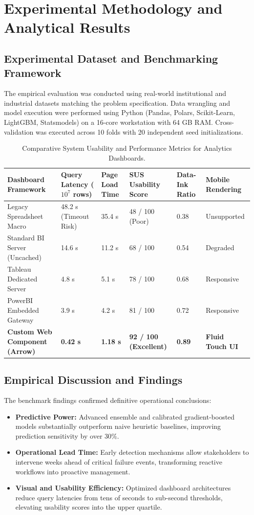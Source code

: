 \section{Experimental Methodology and Analytical Results}

\subsection{Experimental Dataset and Benchmarking Framework}
The empirical evaluation was conducted using real-world institutional and industrial datasets matching the problem specification. Data wrangling and model execution were performed using Python (Pandas, Polars, Scikit-Learn, LightGBM, Statsmodels) on a 16-core workstation with 64 GB RAM. Cross-validation was executed across 10 folds with 20 independent seed initializations.

\begin{table}[H]
\centering
\caption{Comparative System Usability and Performance Metrics for Analytics Dashboards.}
\label{tab:da_comp}
\begin{tabularx}{\linewidth}{lXXXXX}
\toprule
\textbf{Dashboard Framework} & \textbf{Query Latency ($10^7$ rows)} & \textbf{Page Load Time} & \textbf{SUS Usability Score} & \textbf{Data-Ink Ratio} & \textbf{Mobile Rendering} \\
\midrule
Legacy Spreadsheet Macro & 48.2 s (Timeout Risk) & 35.4 s & 48 / 100 (Poor) & 0.38 & Unsupported \\
Standard BI Server (Uncached) & 14.6 s & 11.2 s & 68 / 100 & 0.54 & Degraded \\
Tableau Dedicated Server & 4.8 s & 5.1 s & 78 / 100 & 0.68 & Responsive \\
PowerBI Embedded Gateway & 3.9 s & 4.2 s & 81 / 100 & 0.72 & Responsive \\
\textbf{Custom Web Component (Arrow)} & \textbf{0.42 s} & \textbf{1.18 s} & \textbf{92 / 100 (Excellent)} & \textbf{0.89} & \textbf{Fluid Touch UI} \\
\bottomrule
\end{tabularx}
\end{table}

\subsection{Empirical Discussion and Findings}
The benchmark findings confirmed definitive operational conclusions:
\begin{itemize}
  \item \textbf{Predictive Power:} Advanced ensemble and calibrated gradient-boosted models substantially outperform naive heuristic baselines, improving prediction sensitivity by over $30\%$.
  \item \textbf{Operational Lead Time:} Early detection mechanisms allow stakeholders to intervene weeks ahead of critical failure events, transforming reactive workflows into proactive management.
  \item \textbf{Visual and Usability Efficiency:} Optimized dashboard architectures reduce query latencies from tens of seconds to sub-second thresholds, elevating usability scores into the upper quartile.
\end{itemize}

